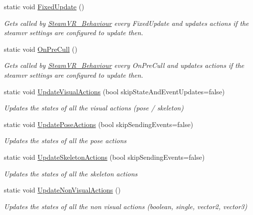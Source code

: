 \begin{DoxyCompactItemize}
static void \mbox{\hyperlink{class_valve_1_1_v_r_1_1_steam_v_r___input_ac2be0c217bd7a2ee78bf0e8e33718247}{Fixed\+Update}} ()
\begin{DoxyCompactList}\small\item\em Gets called by \mbox{\hyperlink{class_valve_1_1_v_r_1_1_steam_v_r___behaviour}{Steam\+V\+R\+\_\+\+Behaviour}} every Fixed\+Update and updates actions if the steamvr settings are configured to update then. \end{DoxyCompactList}\item 
static void \mbox{\hyperlink{class_valve_1_1_v_r_1_1_steam_v_r___input_ab538ac35afe693bc10ea6c9f25812068}{On\+Pre\+Cull}} ()
\begin{DoxyCompactList}\small\item\em Gets called by \mbox{\hyperlink{class_valve_1_1_v_r_1_1_steam_v_r___behaviour}{Steam\+V\+R\+\_\+\+Behaviour}} every On\+Pre\+Cull and updates actions if the steamvr settings are configured to update then. \end{DoxyCompactList}\item 
static void \mbox{\hyperlink{class_valve_1_1_v_r_1_1_steam_v_r___input_a6e0cac70d4cca2721d8be761b238da4f}{Update\+Visual\+Actions}} (bool skip\+State\+And\+Event\+Updates=false)
\begin{DoxyCompactList}\small\item\em Updates the states of all the visual actions (pose / skeleton) \end{DoxyCompactList}\item 
static void \mbox{\hyperlink{class_valve_1_1_v_r_1_1_steam_v_r___input_a330caa435d2e10df76e907ac6bf05f84}{Update\+Pose\+Actions}} (bool skip\+Sending\+Events=false)
\begin{DoxyCompactList}\small\item\em Updates the states of all the pose actions \end{DoxyCompactList}\item 
static void \mbox{\hyperlink{class_valve_1_1_v_r_1_1_steam_v_r___input_a89a291058bb1162ddb8f2da57847bd7e}{Update\+Skeleton\+Actions}} (bool skip\+Sending\+Events=false)
\begin{DoxyCompactList}\small\item\em Updates the states of all the skeleton actions \end{DoxyCompactList}\item 
static void \mbox{\hyperlink{class_valve_1_1_v_r_1_1_steam_v_r___input_ab9f7ee5abcd2dd6a91125f5759e728a9}{Update\+Non\+Visual\+Actions}} ()
\begin{DoxyCompactList}\small\item\em Updates the states of all the non visual actions (boolean, single, vector2, vector3) \end{DoxyCompactList}\item 

\end{DoxyCompactItemize}

